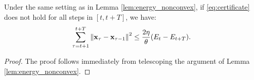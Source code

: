 \begingroup
\def\thetheorem{\ref{cor:localball}}
\begin{corollary}
Under the same setting as in Lemma \ref{lem:energy_nonconvex}, if \eqref{eq:certificate} does not hold for all steps in $[t, t+T]$, we have:
\begin{equation*}
\sum_{\tau = t+1}^{t+T}\left\|{\mathbf{x}_\tau - \mathbf{x}_{\tau-1}}\right\|^2
\le \frac{2\eta}{\theta} (E_t - E_{t+T}).
\end{equation*}
\end{corollary}
\addtocounter{theorem}{-1}
\endgroup


\begin{proof}
The proof follows immediately from telescoping the argument of Lemma \ref{lem:energy_nonconvex}.
\end{proof}




